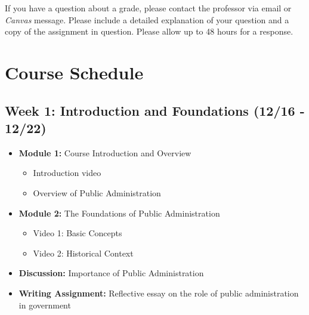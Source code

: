 \documentclass[12pt, letterpaper]{article}
\begin{document}
If you have a question about a grade, please contact the professor via email or \emph{Canvas} message. Please include a detailed explanation of your question and a copy of the assignment in question. Please allow up to 48 hours for a response. 


\section*{Course Schedule}

\subsection*{Week 1: Introduction and Foundations (12/16 - 12/22)}

\begin{itemize}
    \item \textbf{Module 1:} Course Introduction and Overview
        \begin{itemize}
            \item Introduction video
            \item Overview of Public Administration
        \end{itemize}
    \item \textbf{Module 2:} The Foundations of Public Administration
        \begin{itemize}
            \item Video 1: Basic Concepts
            \item Video 2: Historical Context
        \end{itemize}
    \item \textbf{Discussion:} Importance of Public Administration
    \item \textbf{Writing Assignment:} Reflective essay on the role of public administration in government
\end{itemize}
\end{document}
